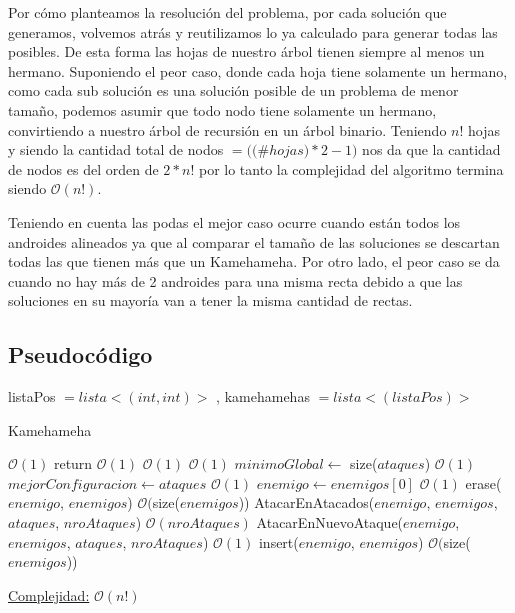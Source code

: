 Por cómo planteamos la resolución del problema, por cada solución que generamos, volvemos atrás y reutilizamos lo ya calculado para generar todas las posibles. De esta forma las hojas de nuestro árbol tienen siempre al menos un hermano. Suponiendo el peor caso, donde cada hoja tiene solamente un hermano, como cada sub solución es una solución posible de un problema de menor tamaño, podemos asumir que todo nodo tiene solamente un hermano, convirtiendo a nuestro árbol de recursión en un árbol binario. Teniendo $n!$ hojas y siendo la cantidad total de nodos $= (($\#$hojas)*2 - 1)$ nos da que la cantidad de nodos es del orden de $2*n!$ por lo tanto la complejidad del algoritmo termina siendo $\mathcal{O}(n!)$.

Teniendo en cuenta las podas el mejor caso ocurre cuando están todos los androides alineados ya que al comparar el tamaño de las soluciones se descartan todas las que tienen más que un Kamehameha. Por otro lado, el peor caso se da cuando no hay más de 2 androides para una misma recta debido a que las soluciones en su mayoría van a tener la misma cantidad de rectas.

\subsection{Pseudocódigo}
listaPos $= lista<(int,int)>$ , kamehamehas $= lista<(listaPos)>$

\begin{algorithm}
\caption{Kamehameha}
\begin{algorithmic}
	 \Comment $\mathcal{O}(1)$
		\State return \Comment $\mathcal{O}(1)$
	\EndIf
	 \Comment $\mathcal{O}(1)$
		\Comment $\mathcal{O}(1)$
			\State $minimoGlobal \gets$ size($ataques$) \Comment $\mathcal{O}(1)$ 		
			\State $mejorConfiguracion \gets ataques$ \Comment $\mathcal{O}(1)$
		\EndIf
	\Else
		\State $enemigo \gets enemigos[0]$ \Comment $\mathcal{O}(1)$
		\State erase($enemigo$, $enemigos$) \Comment $\mathcal{O}($size($enemigos$))
		\State AtacarEnAtacados($enemigo$, $enemigos$, $ataques$, $nroAtaques$)	\Comment $\mathcal{O}(nroAtaques)$
		\State AtacarEnNuevoAtaque($enemigo$, $enemigos$, $ataques$, $nroAtaques$) \Comment $\mathcal{O}(1)$
		\State insert($enemigo$, $enemigos$) \Comment $\mathcal{O}($size($enemigos$))
\EndIf
\EndFunction
\end{algorithmic}
\underline{Complejidad:} $\mathcal{O}(n!)$\\
    
\end{algorithm}

